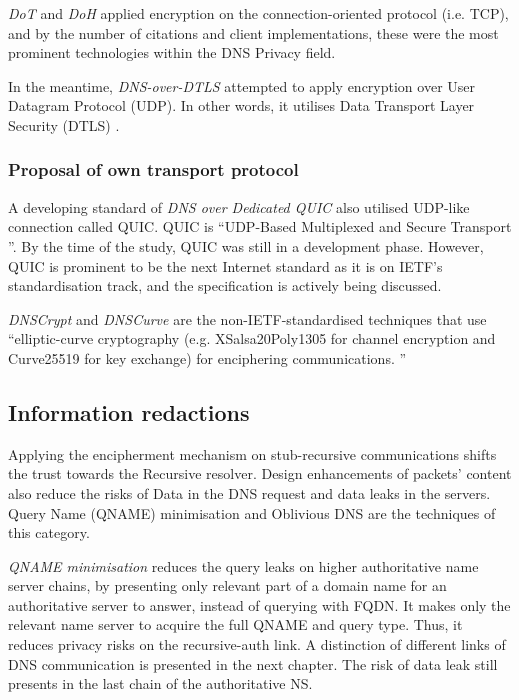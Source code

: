 \textit{DoT} and \textit{DoH} applied encryption on the connection-oriented protocol (i.e. TCP), and by the number of citations and client implementations, these were the most prominent technologies within the DNS Privacy field.

In the meantime, \textit{DNS-over-DTLS} attempted to apply encryption over User Datagram Protocol (UDP). In other words, it utilises Data Transport Layer Security (DTLS) \cite{rfc4347}.

\subsubsection{Proposal of own transport protocol}
A developing standard of \textit{DNS over Dedicated QUIC} \cite{dnsoquic} also utilised UDP-like connection called QUIC.
QUIC is ``UDP-Based Multiplexed and Secure Transport \cite{ietf-quic-transport-20}''.
By the time of the study, QUIC was still in a development phase. However, QUIC is prominent to be the next Internet standard as it is on IETF's standardisation  track, and the specification is actively being discussed.

\textit{DNSCrypt} \cite{denis2015dnscrypt} and \textit{DNSCurve} \cite{dempsky2010dnscurve} are the non-IETF-standardised techniques that use ``elliptic-curve cryptography (e.g. XSalsa20Poly1305 \cite{chacha} for channel encryption and Curve25519 for key exchange) for enciphering communications. \cite{van2018privacy}''

\subsection{Information redactions}
Applying the encipherment mechanism on stub-recursive communications shifts the trust towards the Recursive resolver.
Design enhancements of packets' content also reduce the risks of Data in the DNS request and data leaks in the servers.
Query Name (QNAME) minimisation \cite{bortzmeyer2016dns} and Oblivious DNS \cite{annee-dprive-oblivious-dns-00} are the techniques of this category.

\textit{QNAME minimisation} reduces the query leaks on higher authoritative name server chains, by presenting only relevant part of a domain name for an authoritative server to answer, instead of querying with FQDN.
It makes only the relevant name server to acquire the full QNAME and query type. Thus, it reduces privacy risks on the recursive-auth link.
A distinction of different links of DNS communication is presented in the next chapter.
The risk of data leak still presents in the last chain of the authoritative NS.

